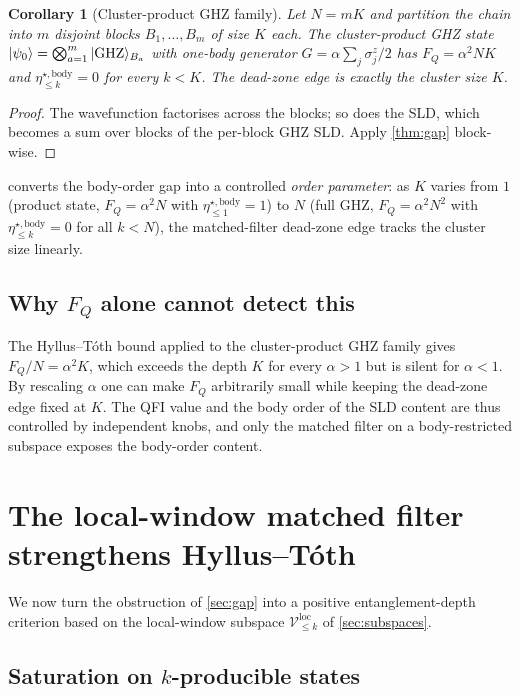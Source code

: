 \documentclass[11pt,a4paper]{article}
\newcommand{\FQ}{F_Q}
\newcommand{\PsiZ}{\ket{\psi_0}}
\newcommand{\Vloc}[1]{\mathcal{V}^{\mathrm{loc}}_{\le #1}}
\newcommand{\etabody}[1]{\eta^{\star,\mathrm{body}}_{\le #1}}
\newtheorem{corollary}{Corollary}
\begin{document}
\begin{corollary}[Cluster-product GHZ family]
\label{cor:cluster_GHZ}
Let $N=mK$ and partition the chain into $m$ disjoint blocks
$B_1,\dots,B_m$ of size $K$ each.  The cluster-product GHZ state
$\PsiZ=\bigotimes_{a=1}^m|{\rm GHZ}\rangle_{B_a}$ with one-body
generator $G=\alpha\sum_j\sigma^z_j/2$ has $\FQ=\alpha^2NK$ and
$\etabody{k}=0$ for every $k<K$.  The dead-zone edge is exactly
the cluster size $K$.
\end{corollary}
\begin{proof}
The wavefunction factorises across the blocks; so does the SLD,
which becomes a sum over blocks of the per-block GHZ SLD.  Apply
\cref{thm:gap} block-wise.
\end{proof}

 converts the body-order gap into a
controlled \emph{order parameter}: as $K$ varies from $1$ (product
state, $\FQ=\alpha^2N$ with $\etabody{1}=1$) to $N$ (full GHZ,
$\FQ=\alpha^2N^2$ with $\etabody{k}=0$ for all $k<N$), the
matched-filter dead-zone edge tracks the cluster size linearly.

\subsection{Why $\FQ$ alone cannot detect this}

The Hyllus--T\'oth bound applied to the cluster-product GHZ family
gives $\FQ/N=\alpha^2K$, which exceeds the depth $K$ for every
$\alpha>1$ but is silent for $\alpha<1$.  By rescaling $\alpha$ one
can make $\FQ$ arbitrarily small while keeping the dead-zone edge
fixed at $K$.  The QFI value and the body order of the SLD content
are thus controlled by independent knobs, and only the matched
filter on a body-restricted subspace exposes the body-order content.

\section{The local-window matched filter strengthens Hyllus--T\'oth}
\label{sec:depth}

We now turn the obstruction of \cref{sec:gap} into a positive
entanglement-depth criterion based on the local-window subspace
$\Vloc{k}$ of \cref{sec:subspaces}.

\subsection{Saturation on $k$-producible states}
\end{document}
